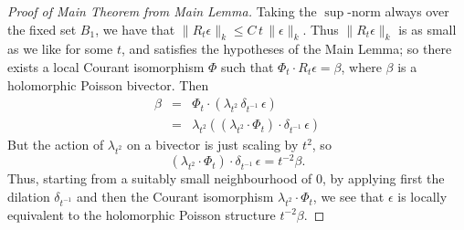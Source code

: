 \documentclass{article}
\begin{document}
\begin{proof}[Proof of Main Theorem from Main Lemma]
Taking the $\sup$-norm always over the fixed set $B_1$, we have that $\|R_t \epsilon\|_k \leq C\,t\, \|\epsilon\|_k$.
Thus $\|R_t \epsilon\|_k$ is as small as we like for some $t$, and satisfies the hypotheses of the Main Lemma; so there exists a local Courant isomorphism $\Phi$ such that $\Phi_t \cdot R_t \epsilon = \beta$, where $\beta$ is a holomorphic Poisson bivector.  Then
\begin{eqnarray*}
\beta &=& \Phi_t \cdot \left(\lambda_{t^2}\, \delta_{t^{-1}}\, \epsilon\right) \\
&=& \lambda_{t^2} \left((\lambda_{t^2}\cdot\Phi_t) \cdot \delta_{t^{-1}}\, \epsilon\right)
\end{eqnarray*}
But the action of $\lambda_{t^2}$ on a bivector is just scaling by $t^2$, so
$$(\lambda_{t^2}\cdot\Phi_t) \cdot \delta_{t^{-1}}\, \epsilon = t^{-2}\beta.$$
Thus, starting from a suitably small neighbourhood of $0$, by applying first the dilation $\delta_{t^{-1}}$ and then the Courant isomorphism $\lambda_{t^2}\cdot\Phi_t$, we see that $\epsilon$ is locally equivalent to the holomorphic Poisson structure $t^{-2}\beta$.
\end{proof}



\end{document}
